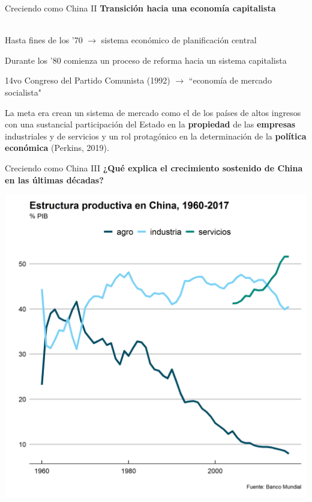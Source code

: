 \documentclass{beamer}
\let\tempone\itemize
\let\temptwo\enditemize
\renewenvironment{itemize}{\tempone\addtolength{\itemsep}{0.5\baselineskip}}{\temptwo}
\begin{document}
	\begin{frame}{Creciendo como China II}
		\textbf{Transición hacia una economía capitalista} \\~\\
		\begin{itemize}
			\item Hasta fines de los '70 $\rightarrow$ sistema económico de planificación central
			\item Durante los '80 comienza un proceso de reforma hacia un sistema capitalista
			\item 14vo Congreso del Partido Comunista (1992) $\rightarrow$ ``economía de mercado socialista"
			\item La meta era crean un sistema de mercado como el de los países de altos ingresos con una sustancial participación del Estado en la \textbf{propiedad} de las \textbf{empresas} industriales y de servicios y un rol protagónico en la determinación de la \textbf{política económica} (Perkins, 2019).
		\end{itemize}
	\end{frame}

	\begin{frame}[c]{Creciendo como China III}
		\textbf{¿Qué explica el crecimiento sostenido de China en las últimas décadas?}
	\end{frame}

	\begin{frame}[plain]
		\centering
		\includegraphics[width=.8\linewidth, keepaspectratio]{estr_prod_60}
	\end{frame}
\end{document}
